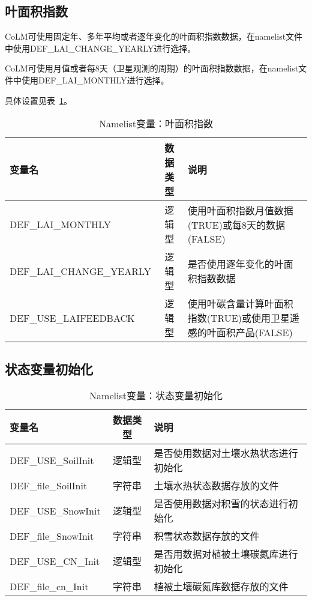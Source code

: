 \documentclass[a4paper,12pt,twoside]{article}
\begin{document}
\subsection{叶面积指数}

CoLM可使用固定年、多年平均或者逐年变化的叶面积指数数据，在namelist文件中使用DEF\_LAI\_CHANGE\_YEARLY进行选择。

CoLM可使用月值或者每8天（卫星观测的周期）的叶面积指数数据，在namelist文件中使用DEF\_LAI\_MONTHLY进行选择。

具体设置见表~\ref{table_nl_lai}。

\begin{table}[!htbp]
\caption{Namelist变量：叶面积指数}
\label{table_nl_lai}
\centering \renewcommand{\arraystretch}{1.5}
\begin{tabular}{lcp{}}
\toprule
\textbf{变量名} & \textbf{数据类型} & \textbf{说明} \\\midrule
DEF\_LAI\_MONTHLY & 逻辑型 & 使用叶面积指数月值数据(TRUE)或每8天的数据(FALSE)\\
DEF\_LAI\_CHANGE\_YEARLY  & 逻辑型 & 是否使用逐年变化的叶面积指数数据 \\
DEF\_USE\_LAIFEEDBACK & 逻辑型 & 使用叶碳含量计算叶面积指数(TRUE)或使用卫星遥感的叶面积产品(FALSE) \\
\bottomrule
\end{tabular} 
\end{table}
\clearpage

\subsection{状态变量初始化}
\begin{table}[!htbp]
\caption{Namelist变量：状态变量初始化}
\label{table_nl_ini}
\centering \renewcommand{\arraystretch}{1.5}
\begin{tabular}{lcp{}}
\toprule
\textbf{变量名} & \textbf{数据类型} & \textbf{说明} \\\midrule
DEF\_USE\_SoilInit & 逻辑型 & 是否使用数据对土壤水热状态进行初始化 \\
DEF\_file\_SoilInit & 字符串 & 土壤水热状态数据存放的文件 \\
DEF\_USE\_SnowInit & 逻辑型 & 是否使用数据对积雪的状态进行初始化 \\
DEF\_file\_SnowInit & 字符串 & 积雪状态数据存放的文件 \\
DEF\_USE\_CN\_Init & 逻辑型 & 是否用数据对植被土壤碳氮库进行初始化 \\
DEF\_file\_cn\_Init & 字符串 & 植被土壤碳氮库数据存放的文件 \\
\bottomrule
\end{tabular} 
\end{table}
\end{document}

